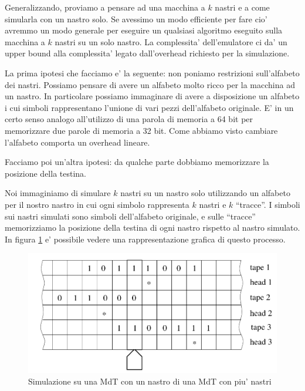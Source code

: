 



Generalizzando, proviamo a pensare ad una macchina a $k$ nastri e a come simularla con un nastro
solo. Se avessimo un modo efficiente per fare cio' avremmo un modo generale per eseguire un qualsiasi
algoritmo eseguito sulla macchina a $k$ nastri su un solo nastro. La complessita' dell'emulatore ci
da' un upper bound alla complessita' legato dall'overhead richiesto per la simulazione.

La prima ipotesi che facciamo e' la seguente: non poniamo restrizioni sull'alfabeto dei nastri.
Possiamo pensare di avere un alfabeto molto ricco per la macchina ad un nastro. In particolare
possiamo immaginare di avere a disposizione un alfabeto i cui simboli rappresentano l'unione di vari
pezzi dell'alfabeto originale. E' in un certo senso analogo all'utilizzo di una parola di memoria a
64 bit per memorizzare due parole di memoria a 32 bit. Come abbiamo visto cambiare l'alfabeto
comporta un overhead lineare.

Facciamo poi un'altra ipotesi: da qualche parte dobbiamo memorizzare la posizione della testina.

Noi immaginiamo di simulare $k$ nastri su un nastro solo utilizzando un alfabeto per il nostro
nastro in cui ogni simbolo rappresenta $k$ nastri e $k$ ``tracce''. I simboli sui nastri simulati
sono simboli dell'alfabeto originale, e sulle ``tracce'' memorizziamo la posizione della testina di
ogni nastro rispetto al nastro simulato. In figura \ref{img:KTapesToOne} e' possibile vedere una rappresentazione
grafica di questo processo.

\begin{figure}[h]
    \begin{center}
        \includegraphics[scale=0.3]{./img/KTapesToOne.png}    
        \caption{Simulazione su una MdT con un nastro di una MdT con piu' nastri}
        \label{img:KTapesToOne}
    \end{center}
\end{figure}

